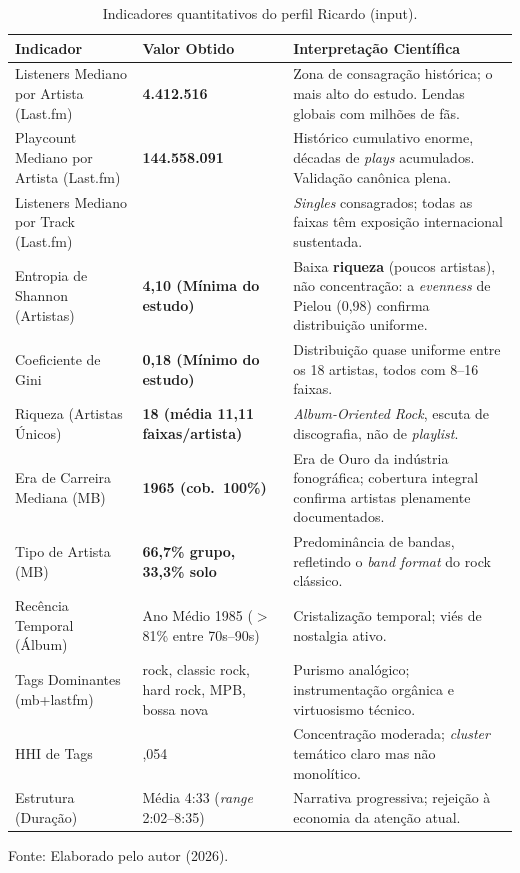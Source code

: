 \documentclass[12pt, %
openright,
oneside, %
a4paper,    %
english,   %
brazil]{facom-ufu-abntex2}
\newcommand{\fontefig}[1]{%
  \par\nopagebreak\vspace{0.15cm}%
  {\centering\footnotesize Fonte: #1\par}%
}
\begin{document}
\begin{table}[H]
\centering
\caption{Indicadores quantitativos do perfil Ricardo (input).}
\label{tab:ricardo}
\footnotesize
\begin{tabularx}{\textwidth}{>{\raggedright\arraybackslash}p{4.3cm} >{\raggedright\arraybackslash}p{2.6cm} X}
\toprule
\textbf{Indicador} & \textbf{Valor Obtido} & \textbf{Interpretação Científica} \\
\midrule
Listeners Mediano por Artista (Last.fm) & \textbf{4.412.516} & Zona de consagração histórica; o mais alto do estudo. Lendas globais com milhões de fãs. \\
Playcount Mediano por Artista (Last.fm) & \textbf{144.558.091} & Histórico cumulativo enorme, décadas de \emph{plays} acumulados. Validação canônica plena. \\
Listeners Mediano por Track (Last.fm) & 311.105 & \emph{Singles} consagrados; todas as faixas têm exposição internacional sustentada. \\
Entropia de Shannon (Artistas) & \textbf{4,10 (Mínima do estudo)} & Baixa \textbf{riqueza} (poucos artistas), não concentração: a \emph{evenness} de Pielou (0,98) confirma distribuição uniforme. \\
Coeficiente de Gini & \textbf{0,18 (Mínimo do estudo)} & Distribuição quase uniforme entre os 18 artistas, todos com 8--16 faixas. \\
Riqueza (Artistas Únicos) & \textbf{18 (média 11,11 faixas/artista)} & \emph{Album-Oriented Rock}, escuta de discografia, não de \emph{playlist}. \\
Era de Carreira Mediana (MB) & \textbf{1965 (cob.\ 100\%)} & Era de Ouro da indústria fonográfica; cobertura integral confirma artistas plenamente documentados. \\
Tipo de Artista (MB) & \textbf{66,7\% grupo, 33,3\% solo} & Predominância de bandas, refletindo o \emph{band format} do rock clássico. \\
Recência Temporal (Álbum) & Ano Médio 1985 ($>$81\% entre 70s--90s) & Cristalização temporal; viés de nostalgia ativo. \\
Tags Dominantes (mb+lastfm) & rock, classic rock, hard rock, MPB, bossa nova & Purismo analógico; instrumentação orgânica e virtuosismo técnico. \\
HHI de Tags & 0,054 & Concentração moderada; \emph{cluster} temático claro mas não monolítico. \\
Estrutura (Duração) & Média 4:33 (\emph{range} 2:02--8:35) & Narrativa progressiva; rejeição à economia da atenção atual. \\
\bottomrule
\end{tabularx}
\fontefig{Elaborado pelo autor (2026).}
\end{table}
\end{document}
